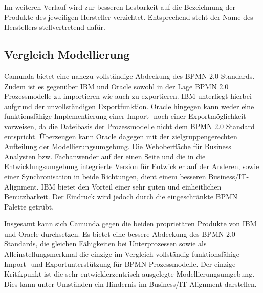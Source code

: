 
\medskip\noindent Im weiteren Verlauf wird zur besseren Lesbarkeit auf die Bezeichnung der Produkte des jeweiligen Hersteller verzichtet. Entsprechend steht der Name des Herstellers stellvertretend dafür.

\subsection{Vergleich Modellierung}
Camunda bietet eine nahezu vollständige Abdeckung des \ac{BPMN} 2.0 Standards. Zudem ist es gegenüber IBM und Oracle sowohl in der Lage \ac{BPMN} 2.0 Prozessmodelle zu importieren wie auch zu exportieren. IBM unterliegt hierbei aufgrund der unvollständigen Exportfunktion. Oracle hingegen kann weder eine funktionsfähige Implementierung einer Import- noch einer Exportmöglichkeit vorweisen, da die Dateibasis der Prozessmodelle nicht dem \ac{BPMN} 2.0 Standard entspricht. Überzeugen kann Oracle dagegen mit der zielgruppengerechten Aufteilung der Modellierungsumgebung. Die Weboberfläche für Business Analysten bzw. Fachanwender auf der einen Seite und die in die Entwicklungsumgebung integrierte Version für Entwickler auf der Anderen, sowie einer Synchronisation in beide Richtungen, dient einem besseren Business/IT-Alignment. IBM bietet den Vorteil einer sehr guten und einheitlichen Benutzbarkeit. Der Eindruck wird jedoch durch die eingeschränkte \ac{BPMN} Palette getrübt.

\smallskip\noindent Insgesamt kann sich Camunda gegen die beiden proprietären Produkte von IBM und Oracle durchsetzen. Es bietet eine bessere Abdeckung des \ac{BPMN} 2.0 Standards, die gleichen Fähigkeiten bei Unterprozessen sowie als Alleinstellungsmerkmal die einzige im Vergleich vollständig funktionsfähige Import- und Exportunterstützung für \ac{BPMN} Prozessmodelle. Der einzige Kritikpunkt ist die sehr entwicklerzentrisch ausgelegte Modellierungsumgebung. Dies kann unter Umständen ein Hindernis im Business/IT-Alignment darstellen.


